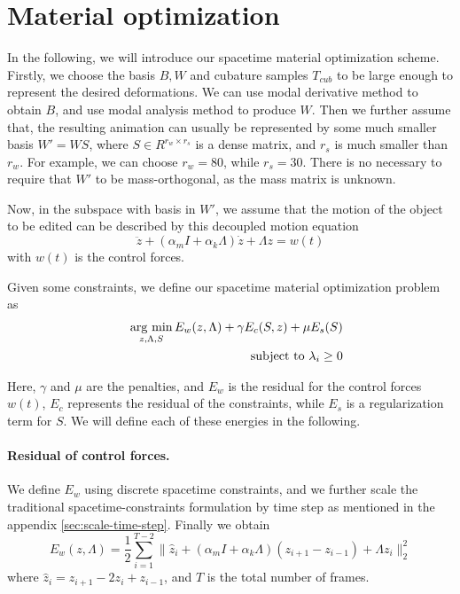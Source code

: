 \documentclass[9pt,twocolumn]{extarticle}
\newcommand{\argmin}{\operatornamewithlimits{arg\ min}}
\begin{document}
\section{Material optimization}\label{sec:mater-optim}
In the following, we will introduce our spacetime material optimization scheme.
Firstly, we choose the basis $B,W$ and cubature samples $T_{cub}$ to be large
enough to represent the desired deformations. We can use modal derivative method
to obtain $B$, and use modal analysis method to produce $W$. Then we further
assume that, the resulting animation can usually be represented by some much
smaller basis $W'=WS$, where $S\in R^{r_w\times r_s}$ is a dense matrix, and
$r_s$ is much smaller than $r_w$. For example, we can choose $r_w=80$, while
$r_s=30$. There is no necessary to require that $W'$ to be mass-orthogonal, as
the mass matrix is unknown.

Now, in the subspace with basis in $W'$, we assume that the motion of the object
to be edited can be described by this decoupled motion equation
\begin{equation} \label{ma_eq_1}
  \ddot{z} + (\alpha_mI+\alpha_k\Lambda)\dot{z} + \Lambda{z} = w(t)
\end{equation}
with $w(t)$ is the control forces.

Given some constraints, we define our spacetime material optimization problem as
\begin{eqnarray}\label{mtl-opt}
  &&\argmin_{z,\Lambda,S} E_w(z,\Lambda)+\gamma E_c(S,z)+\mu E_s(S)\\
  &&\mbox {subject to } \lambda_i \ge 0
\end{eqnarray}

Here, $\gamma$ and $\mu$ are the penalties, and $E_w$ is the residual for the
control forces $w(t)$, $E_c$ represents the residual of the constraints, while
$E_s$ is a regularization term for $S$. We will define each of these energies in
the following. 

\paragraph{Residual of control forces.} We define $E_w$ using discrete spacetime
constraints, and we further scale the traditional spacetime-constraints
formulation by time step as mentioned in the appendix
\ref{sec:scale-time-step}. Finally we obtain
\begin{equation} \label{ew}
  E_w(z,\Lambda) = \frac{1}{2}\sum_{i=1}^{T-2}\|\hat{z}_i+(\alpha_mI+\alpha_k\Lambda)(z_{i+1}-z_{i-1})+\Lambda z_i\|_2^2
\end{equation}
where $\hat{z}_i=z_{i+1}-2z_{i}+z_{i-1}$, and $T$ is the total number of frames.
\end{document}
